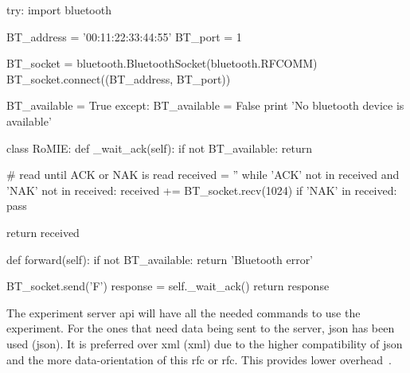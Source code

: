 \begin{center}
\begin{minipage}{.9\textwidth}
\singlespace
{}
\begin{pyglist}[language=python, caption={\acrlong{bt} connection example.},
	label={alg:rasp_bluetooth}, listingname={Algorithm}, numbers=left]
try:
    import bluetooth

    BT_address = '00:11:22:33:44:55'
    BT_port = 1

    BT_socket = bluetooth.BluetoothSocket(bluetooth.RFCOMM)
    BT_socket.connect((BT_address, BT_port))

    BT_available = True
except:
    BT_available = False
    print 'No bluetooth device is available'

class RoMIE:
    def _wait_ack(self):
        if not BT_available: return

        # read until ACK or NAK is read
        received = ''
        while 'ACK' not in received and 'NAK' not in received:
            received += BT_socket.recv(1024)
        if 'NAK' in received:
            pass

        return received

    def forward(self):
        if not BT_available: return 'Bluetooth error'

        BT_socket.send('F')
        response = self._wait_ack()
        return response
\end{pyglist}
\end{minipage}
\end{center}

The experiment server \acrshort{api} will have all the needed commands to use the experiment. For
the ones that need data being sent to the server, \acrshort{json} has been used (\acrlong{json}). It
is preferred over \acrshort{xml} (\acrlong{xml}) due to the higher compatibility of \acrshort{json}
and the more data-orientation of this \acrlong{rfc} or \acrshort{rfc}. This provides lower
overhead~\cite{xml_vs_json}.

